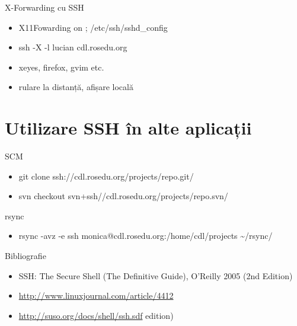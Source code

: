 \documentclass{beamer}
\begin{document}
\begin{frame}{X-Forwarding cu SSH}
  \begin{itemize}
    \item X11Fowarding on ; /etc/ssh/sshd\_config
    \item ssh -X -l lucian cdl.rosedu.org
    \item xeyes, firefox, gvim etc.
    \item rulare la distanță, afișare locală
  \end{itemize}
\end{frame}

\section{Utilizare SSH \^{i}n alte aplicații}
\frame{\tableofcontents[currentsection]}

\begin{frame}{SCM}
  \begin{itemize}
    \item git clone ssh://cdl.rosedu.org/projects/repo.git/
    \item svn checkout svn+ssh//cdl.rosedu.org/projects/repo.svn/
  \end{itemize}
\end{frame}

\begin{frame}{rsync}
  \begin{itemize}
    \item rsync -avz -e ssh monica@cdl.rosedu.org:/home/cdl/projects
\~{}/rsync/
  \end{itemize}
\end{frame}

\begin{frame}{Bibliografie}
  \begin{itemize}
    \item SSH: The Secure Shell (The Definitive Guide), O'Reilly 2005 (2nd
Edition)
    \item \url{http://www.linuxjournal.com/article/4412}
    \item \url{http://suso.org/docs/shell/ssh.sdf}
edition)
  \end{itemize}
\end{frame}
\end{document}
